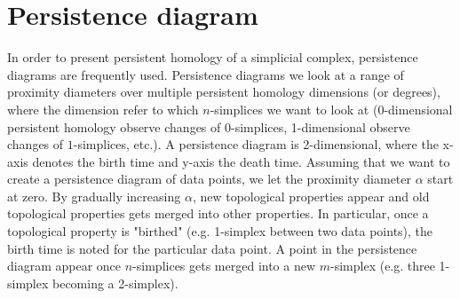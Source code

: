 \section{Persistence diagram}
\label{sec:persistence diagram}
In order to present persistent homology of a simplicial complex, persistence diagrams are frequently used. Persistence diagrams we look at a range of proximity diameters over multiple persistent homology dimensions (or degrees), where the dimension refer to which $n$-simplices we want to look at (0-dimensional persistent homology observe changes of $0$-simplices, 1-dimensional observe changes of $1$-simplices, etc.). A persistence diagram is 2-dimensional, where the x-axis denotes the birth time and y-axis the death time. Assuming that we want to create a persistence diagram of data points, we let the proximity diameter $\alpha$ start at zero. By gradually increasing $\alpha$, new topological properties appear and old topological properties gets merged into other properties. In particular, once a topological property is "birthed" (e.g. 1-simplex between two data points), the birth time is noted for the particular data point. A point in the persistence diagram appear once $n$-simplices gets merged into a new $m$-simplex (e.g. three 1-simplex becoming a 2-simplex).

